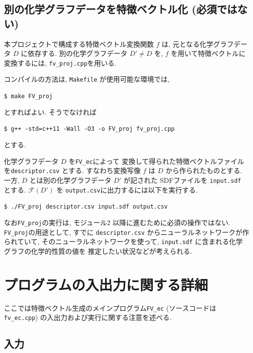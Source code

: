 \documentclass[11pt,titlepage,dvipdfmx,twoside]{jsbook}
\begin{document}
\subsection{別の化学グラフデータを特徴ベクトル化 (必須ではない)}

本プロジェクトで構成する特徴ベクトル変換関数 $f$ は,
元となる化学グラフデータ $D$ に依存する.
別の化学グラフデータ $D'\ne D$ を,
$f$ を用いて特徴ベクトルに変換するには,
{\tt fv\_proj.cpp}を用いる. 


コンパイルの方法は, {\tt Makefile} が使用可能な環境では, 
\begin{oframed}
{\small
\verb|$ make FV_proj|
}
\end{oframed}
とすればよい. そうでなければ
\begin{oframed}
{\small
\verb|$ g++ -std=c++11 -Wall -O3 -o FV_proj fv_proj.cpp|
}
\end{oframed}
とする.

化学グラフデータ $D$ を{\tt FV\_ec}によって
変換して得られた特徴ベクトルファイルを{\tt descriptor.csv}
とする. すなわち変換写像 $f$ は $D$ から作られたものとする. 
一方, $D$ とは別の化学グラフデータ $D'$ が記された
SDFファイルを {\tt input.sdf} とする.
${\mathcal F}(D')$ を {\tt output.csv}に出力するには以下を実行する.  
\begin{oframed}
{\small
\verb|$ ./FV_proj descriptor.csv input.sdf output.csv|
}
\end{oframed}


なお{\tt FV\_proj}の実行は, モジュール2 以降に進むために必須の操作ではない.
{\tt FV\_proj}の用途として,
すでに {\tt descriptor.csv} からニューラルネットワークが作られていて,
そのニューラルネットワークを使って, {\tt input.sdf} に含まれる化学グラフの化学的性質の値を
推定したい状況などが考えられる. 

\section{プログラムの入出力に関する詳細}
\label{chap:1io}

ここでは特徴ベクトル生成のメインプログラム{\tt FV\_ec} (ソースコードは {\tt fv\_ec.cpp})
の入出力および実行に関する注意を述べる. 

\subsection{入力}
\end{document}
